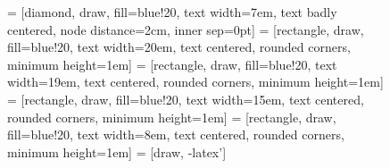 \documentclass[5p,times]{elsarticle}
\begin{document}
\begin{figure}[]
\centering
{} = [diamond, draw, fill=blue!20, text width=7em, text badly centered, node distance=2cm, inner sep=0pt]
 = [rectangle, draw, fill=blue!20, text width=20em, text centered, rounded corners, minimum height=1em]
 = [rectangle, draw, fill=blue!20, text width=19em, text centered, rounded corners, minimum height=1em]
 = [rectangle, draw, fill=blue!20, text width=15em, text centered, rounded corners, minimum height=1em]
 = [rectangle, draw, fill=blue!20, text width=8em, text centered, rounded corners, minimum height=1em]
 = [draw, -latex']

\end{figure}
\end{document}
